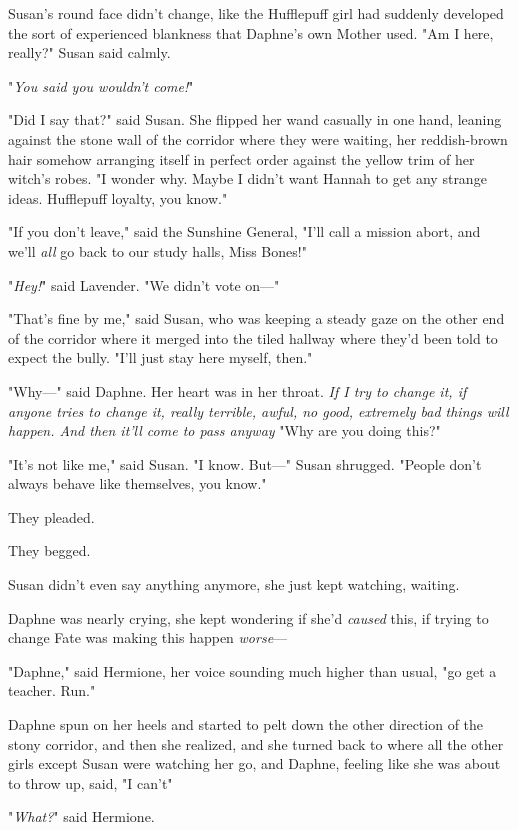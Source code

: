 Susan's round face didn't change, like the Hufflepuff girl had suddenly
developed the sort of experienced blankness that Daphne's own Mother used. "Am
I here, really?" Susan said calmly.

"\emph{You said you wouldn't come!}"

"Did I say that?" said Susan. She flipped her wand casually in one hand,
leaning against the stone wall of the corridor where they were waiting, her
reddish-brown hair somehow arranging itself in perfect order against the yellow
trim of her witch's robes. "I wonder why. Maybe I didn't want Hannah to get any
strange ideas. Hufflepuff loyalty, you know."

"If you don't leave," said the Sunshine General, "I'll call a mission abort,
and we'll \emph{all} go back to our study halls, Miss Bones!"

"\emph{Hey!}" said Lavender. "We didn't vote on\mbox{---}"

"That's fine by me," said Susan, who was keeping a steady gaze on the other end
of the corridor where it merged into the tiled hallway where they'd been told
to expect the bully. "I'll just stay here myself, then."

"Why\mbox{---}" said Daphne. Her heart was in her throat. \emph{If I try to change it,
if \emph{anyone} tries to change it, really terrible, awful, no good, extremely
bad things will happen. And then it'll come to pass anyway{\el}} "Why are
you doing this?"

"It's not like me," said Susan. "I know. But\mbox{---}" Susan shrugged. "People don't
always behave like themselves, you know."

They pleaded.

They begged.

Susan didn't even say anything anymore, she just kept watching, waiting.

Daphne was nearly crying, she kept wondering if she'd \emph{caused} this, if
trying to change Fate was making this happen \emph{worse}---

"Daphne," said Hermione, her voice sounding much higher than usual, "go get a
teacher. Run."

Daphne spun on her heels and started to pelt down the other direction of the
stony corridor, and then she realized, and she turned back to where all the
other girls except Susan were watching her go, and Daphne, feeling like she was
about to throw up, said, "I can't{\el}"

"\emph{What?}" said Hermione.


